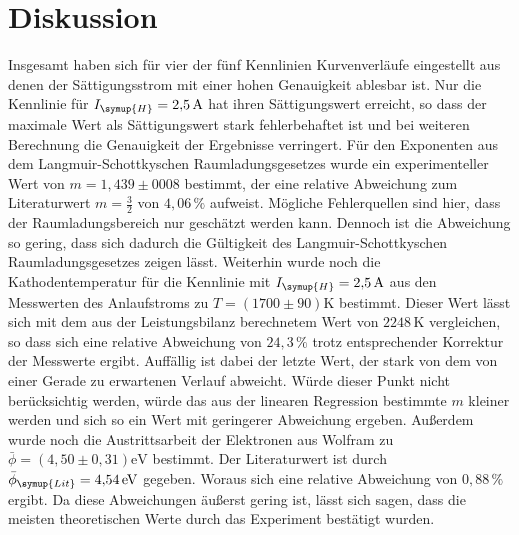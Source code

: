 \section{Diskussion}
\label{sec:Diskussion}
Insgesamt haben sich für vier der fünf Kennlinien Kurvenverläufe eingestellt aus denen der Sättigungsstrom mit
einer hohen Genauigkeit ablesbar ist. Nur die Kennlinie für $I_{\symup{H}}=\SI{2,5}{\ampere}$ hat ihren
Sättigungswert erreicht, so dass der maximale Wert als Sättigungswert stark fehlerbehaftet ist und bei weiteren
Berechnung die Genauigkeit der Ergebnisse verringert. Für den Exponenten aus dem Langmuir-Schottkyschen
Raumladungsgesetzes wurde ein experimenteller Wert von $m = 1,439 \pm 0008$ bestimmt, der eine relative Abweichung
zum Literaturwert $m=\frac{3}{2}$ von $4,06\,\%$ aufweist. Mögliche Fehlerquellen sind hier, dass der
Raumladungsbereich nur geschätzt werden kann. Dennoch ist die Abweichung so gering, dass sich dadurch die
Gültigkeit des Langmuir-Schottkyschen Raumladungsgesetzes zeigen lässt. Weiterhin wurde noch die Kathodentemperatur
für die Kennlinie mit $I_{\symup{H}}=\SI{2,5}{\ampere}$ aus den Messwerten des Anlaufstroms zu
$T = (1700 \pm 90)\si{\kelvin}$ bestimmt. Dieser Wert lässt sich mit dem aus der Leistungsbilanz berechnetem Wert
von $2248\,\si{\kelvin}$ vergleichen, so dass sich eine relative Abweichung von $24,3\,\%$ trotz entsprechender
Korrektur der Messwerte ergibt. Auffällig ist dabei der letzte Wert, der stark von dem von einer Gerade zu
erwartenen Verlauf abweicht. Würde dieser Punkt nicht berücksichtig werden, würde das aus der linearen Regression
bestimmte $m$ kleiner werden und sich so ein Wert mit geringerer Abweichung ergeben. Außerdem wurde noch die
Austrittsarbeit der Elektronen aus Wolfram zu $\bar{\phi} = (4,50 \pm 0,31)\si{\eV}$ bestimmt. Der Literaturwert
ist durch $\bar{\phi}_{\symup{Lit}} = \SI{4,54}{\eV}$ gegeben. Woraus sich eine relative Abweichung von
$0,88\,\%$ ergibt. Da diese Abweichungen äußerst gering ist, lässt sich sagen, dass die meisten theoretischen
Werte durch das Experiment bestätigt wurden. 